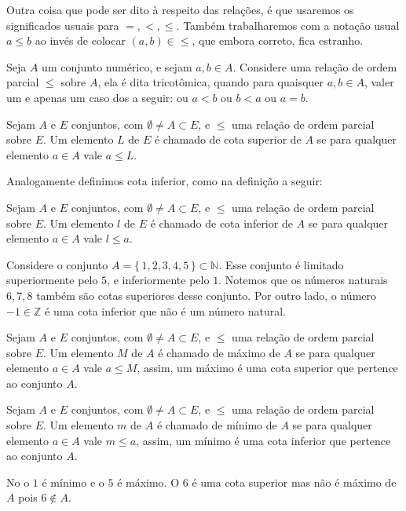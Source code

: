 \documentclass[../main.tex]{subfiles}
\begin{document}
Outra coisa que pode ser dito à respeito das relações, é que usaremos os significados usuais para $=, <, \leq$. Também trabalharemos com a notação usual $a \leq b$ ao invés de colocar $(a,b) \in \leq$, que embora correto, fica estranho. 

\begin{defi}\label{agb-def-relacaoTricotomica}
    Seja $A$ um conjunto numérico, e sejam $a,b \in A$. Considere uma relação de ordem parcial $\leq$ sobre $A$, ela é dita tricotômica,
    quando para quaisquer $a,b \in A$, valer um e apenas um caso dos a seguir: ou $a < b$ ou $b < a$ ou $a = b$.
\end{defi}

\begin{defi}\label{agb-def-cotaSuperior}
    Sejam $A$ e $E$ conjuntos, com $\emptyset \neq A \subset E$, e $\leq$ uma relação de ordem parcial sobre $E$. Um elemento $L$ de $E$ é chamado de cota superior de $A$ se para qualquer elemento $a \in A$ vale $a \leq L$.
\end{defi}
Analogamente definimos cota inferior, como na definição a seguir:
\begin{defi}\label{agb-def-cotaInferior}
    Sejam $A$ e $E$ conjuntos, com $\emptyset \neq A \subset E$, e $\leq$ uma relação de ordem parcial sobre $E$. Um elemento $l$ de $E$ é chamado de cota inferior de $A$ se para qualquer elemento $a \in A$ vale $l \leq a$.
\end{defi}
\begin{ex}\label{agb-ex-cotasSuperiorInferior}
    Considere o conjunto $A = \{\,1,2,3,4,5\,\} \subset \mathbb{N}$. Esse conjunto é limitado superiormente pelo $5$, e inferiormente pelo $1$. Notemos que os números naturais $6,7,8$ também são cotas superiores desse conjunto. Por outro lado, o número $-1 \in \mathbb{Z}$ é uma cota inferior que não é um número natural. 
\end{ex}

\begin{defi}\label{agb-def-maximo}
     Sejam $A$ e $E$ conjuntos, com $\emptyset \neq A \subset E$, e $\leq$ uma relação de ordem parcial sobre $E$. Um elemento $M$ de $A$ é chamado de máximo de $A$ se para qualquer elemento $a \in A$ vale $a \leq M$, assim, um máximo é uma cota superior que pertence ao conjunto $A$.   
\end{defi}
\begin{defi}\label{agb-def-minimo}
     Sejam $A$ e $E$ conjuntos, com $\emptyset \neq A \subset E$, e $\leq$ uma relação de ordem parcial sobre $E$. Um elemento $m$ de $A$ é chamado de mínimo de $A$ se para qualquer elemento $a \in A$ vale $m \leq a$, assim, um mínimo é uma cota inferior que pertence ao conjunto $A$.   
\end{defi}
\begin{ex}
    No  o $1$ é mínimo e o $5$ é máximo. O $6$ é uma cota superior mas não é máximo de $A$ pois $6 \not\in A$.
\end{ex}
\end{document}
